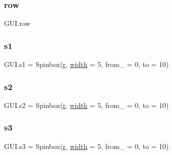 \subsubsection{\texorpdfstring{row}{row}}
{\footnotesize\ttfamily G\+U\+I.\+row}

\mbox{\label{namespace_g_u_i_a9a674293f87e667971e46f422129f8be}} 
\subsubsection{\texorpdfstring{s1}{s1}}
{\footnotesize\ttfamily G\+U\+I.\+s1 = Spinbox(\mbox{\hyperlink{_s_d_l__opengl_8h_a42ce7cdc612e53abee15043f80220d97}{r}}, \mbox{\hyperlink{_s_d_l__opengl_8h_a9a82cf3caff84cabc4598e2619faac17}{width}} = 5, from\+\_\+ = 0, to = 10)}

\mbox{\label{namespace_g_u_i_a9b4f27a5e87a161111559dd8e38219d4}} 
\subsubsection{\texorpdfstring{s2}{s2}}
{\footnotesize\ttfamily G\+U\+I.\+s2 = Spinbox(\mbox{\hyperlink{_s_d_l__opengl_8h_a42ce7cdc612e53abee15043f80220d97}{r}}, \mbox{\hyperlink{_s_d_l__opengl_8h_a9a82cf3caff84cabc4598e2619faac17}{width}} = 5, from\+\_\+ = 0, to = 10)}

\mbox{\label{namespace_g_u_i_a16b808fdebb02f1fb7304c7de82b9584}} 
\subsubsection{\texorpdfstring{s3}{s3}}
{\footnotesize\ttfamily G\+U\+I.\+s3 = Spinbox(\mbox{\hyperlink{_s_d_l__opengl_8h_a42ce7cdc612e53abee15043f80220d97}{r}}, \mbox{\hyperlink{_s_d_l__opengl_8h_a9a82cf3caff84cabc4598e2619faac17}{width}} = 5, from\+\_\+ = 0, to = 10)}

